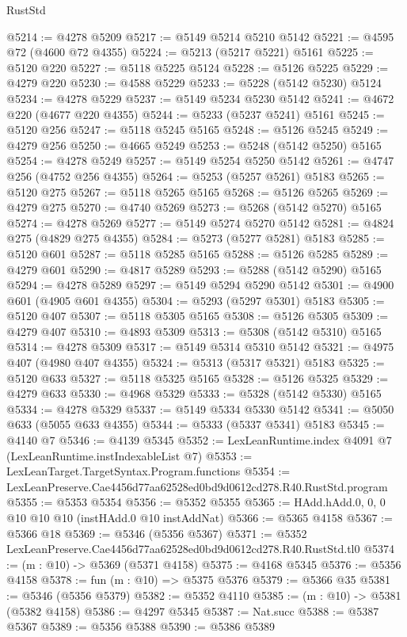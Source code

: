 \begin{lexlean}{RustStd}
\begin{coremodule}
@5214 := @4278 @5209
@5217 := @5149 @5214 @5210 @5142
@5221 := @4595 @72 (@4600 @72 @4355)
@5224 := @5213 (@5217 @5221) @5161
@5225 := @5120 @220
@5227 := @5118 @5225 @5124
@5228 := @5126 @5225
@5229 := @4279 @220
@5230 := @4588 @5229
@5233 := @5228 (@5142 @5230) @5124
@5234 := @4278 @5229
@5237 := @5149 @5234 @5230 @5142
@5241 := @4672 @220 (@4677 @220 @4355)
@5244 := @5233 (@5237 @5241) @5161
@5245 := @5120 @256
@5247 := @5118 @5245 @5165
@5248 := @5126 @5245
@5249 := @4279 @256
@5250 := @4665 @5249
@5253 := @5248 (@5142 @5250) @5165
@5254 := @4278 @5249
@5257 := @5149 @5254 @5250 @5142
@5261 := @4747 @256 (@4752 @256 @4355)
@5264 := @5253 (@5257 @5261) @5183
@5265 := @5120 @275
@5267 := @5118 @5265 @5165
@5268 := @5126 @5265
@5269 := @4279 @275
@5270 := @4740 @5269
@5273 := @5268 (@5142 @5270) @5165
@5274 := @4278 @5269
@5277 := @5149 @5274 @5270 @5142
@5281 := @4824 @275 (@4829 @275 @4355)
@5284 := @5273 (@5277 @5281) @5183
@5285 := @5120 @601
@5287 := @5118 @5285 @5165
@5288 := @5126 @5285
@5289 := @4279 @601
@5290 := @4817 @5289
@5293 := @5288 (@5142 @5290) @5165
@5294 := @4278 @5289
@5297 := @5149 @5294 @5290 @5142
@5301 := @4900 @601 (@4905 @601 @4355)
@5304 := @5293 (@5297 @5301) @5183
@5305 := @5120 @407
@5307 := @5118 @5305 @5165
@5308 := @5126 @5305
@5309 := @4279 @407
@5310 := @4893 @5309
@5313 := @5308 (@5142 @5310) @5165
@5314 := @4278 @5309
@5317 := @5149 @5314 @5310 @5142
@5321 := @4975 @407 (@4980 @407 @4355)
@5324 := @5313 (@5317 @5321) @5183
@5325 := @5120 @633
@5327 := @5118 @5325 @5165
@5328 := @5126 @5325
@5329 := @4279 @633
@5330 := @4968 @5329
@5333 := @5328 (@5142 @5330) @5165
@5334 := @4278 @5329
@5337 := @5149 @5334 @5330 @5142
@5341 := @5050 @633 (@5055 @633 @4355)
@5344 := @5333 (@5337 @5341) @5183
@5345 := @4140 @7
@5346 := @4139 @5345
@5352 := LexLeanRuntime.index @4091 @7 (LexLeanRuntime.instIndexableList @7)
@5353 := LexLeanTarget.TargetSyntax.Program.functions
@5354 := LexLeanPreserve.Cae4456d77aa62528ed0bd9d0612cd278.R40.RustStd.program
@5355 := @5353 @5354
@5356 := @5352 @5355
@5365 := HAdd.hAdd.{0, 0, 0} @10 @10 @10 (instHAdd.{0} @10 instAddNat)
@5366 := @5365 @4158
@5367 := @5366 @18
@5369 := @5346 (@5356 @5367)
@5371 := @5352 LexLeanPreserve.Cae4456d77aa62528ed0bd9d0612cd278.R40.RustStd.tl0
@5374 := (m : @10) -> @5369 (@5371 @4158)
@5375 := @4168 @5345
@5376 := @5356 @4158
@5378 := fun (m : @10) => @5375 @5376
@5379 := @5366 @35
@5381 := @5346 (@5356 @5379)
@5382 := @5352 @4110
@5385 := (m : @10) -> @5381 (@5382 @4158)
@5386 := @4297 @5345
@5387 := Nat.succ
@5388 := @5387 @5367
@5389 := @5356 @5388
@5390 := @5386 @5389

\end{coremodule}
\end{lexlean}
